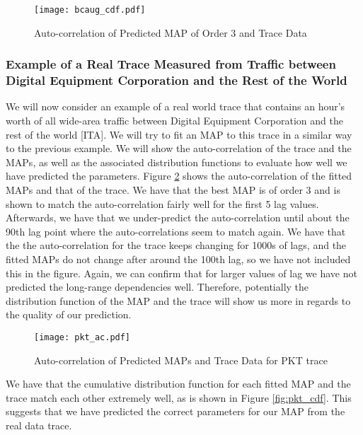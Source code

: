 \documentclass[a4paper,11pt,titlepage]{article}
\begin{document}
\begin{figure}[h!]
\begin{center}
\texttt{[image: bcaug\_cdf.pdf]}
\caption{Auto-correlation of Predicted MAP of Order 3 and Trace Data}
\label{fig:bcaug_cdf}
\end{center}
\end{figure}

\subsubsection{Example of a Real Trace Measured from Traffic between Digital Equipment Corporation and the Rest of the World}

We will now consider an example of a real world trace that contains an hour's worth of all wide-area traffic between Digital Equipment Corporation and the rest of the world [ITA]. We will try to fit an MAP to this trace in a similar way to the previous example. We will show the auto-correlation of the trace and the MAPs, as well as the associated distribution functions to evaluate how well we have predicted the parameters. Figure \ref{fig:pkt_ac} shows the auto-correlation of the fitted MAPs and that of the trace. We have that the best MAP is of order 3 and is shown to match the auto-correlation fairly well for the first 5 lag values. Afterwards, we have that we under-predict the auto-correlation until about the 90th lag point where the auto-correlations seem to match again. We have that the the auto-correlation for the trace keeps changing for 1000s of lags, and the fitted MAPs do not change after around the 100th lag, so we have not included this in the figure. Again, we can confirm that for larger values of lag we have not predicted the long-range dependencies well. Therefore, potentially the distribution function of the MAP and the trace will show us more in regards to the quality of our prediction. 

\begin{figure}[h!]
\begin{center}
\texttt{[image: pkt\_ac.pdf]}
\caption{Auto-correlation of Predicted MAPs and Trace Data for PKT trace}
\label{fig:pkt_ac}
\end{center}
\end{figure}

We have that the cumulative distribution function for each fitted MAP and the trace match each other extremely well, as is shown in Figure \ref{fig:pkt_cdf}. This suggests that we have predicted the correct parameters for our MAP from the real data trace.  
\end{document}
